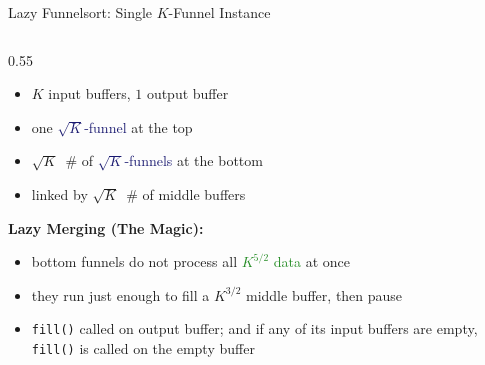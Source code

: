 \documentclass[aspectratio=169, xcolor=dvipsnames]{beamer}
\begin{document}
\begin{frame}{Lazy Funnelsort: Single $K$-Funnel Instance}


    \begin{columns}[T]

        \begin{column}{0.55\textwidth}
            \begin{itemize}\itemsep0.1em
                \item $K$ input buffers, $1$ output buffer
                \item one \textcolor{MidnightBlue}{$\sqrt{K}$-funnel} at the top
                \item $\sqrt{K}$\ \# of \textcolor{MidnightBlue}{$\sqrt{K}$-funnels} at the bottom
                \item linked by $\sqrt{K}$\ \# of \textcolor{BurntOrange}{middle buffers}
            \end{itemize}
            \textbf{Lazy Merging (The Magic):}
            \begin{itemize}\itemsep0.1em
                \item bottom funnels do not process all \textcolor{ForestGreen}{$K^{5/2}$ data} at once
                \item they run just enough to fill a $K^{3/2}$ \textcolor{BurntOrange}{middle buffer}, then \textcolor{RoyalPurple}{pause}
                \item \texttt{fill()} called on output buffer; and if any of its input buffers are empty, \texttt{fill()} is called on the empty buffer
            \end{itemize}
            

\end{column}
\end{columns}
\end{frame}
\end{document}
